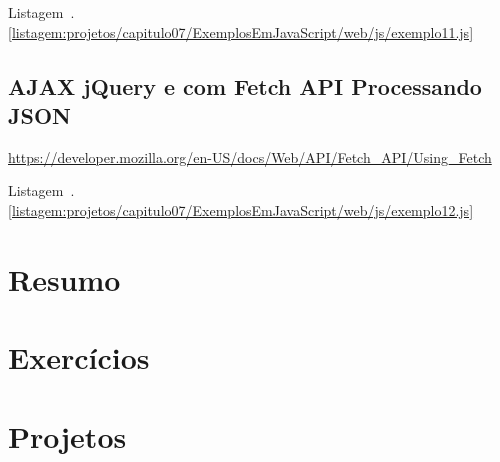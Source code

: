 Listagem~\thechapter.\ref{listagem:projetos/capitulo07/ExemplosEmJavaScript/web/js/exemplo11.js}




\subsection{AJAX jQuery e com Fetch API Processando JSON}

\url{https://developer.mozilla.org/en-US/docs/Web/API/Fetch_API/Using_Fetch}

Listagem~\thechapter.\ref{listagem:projetos/capitulo07/ExemplosEmJavaScript/web/js/exemplo12.js}




\section{Resumo}


\section{Exercícios}


\section{Projetos}
